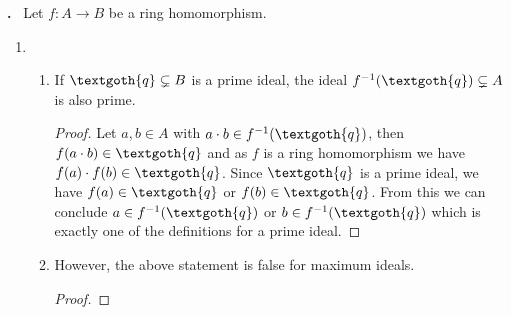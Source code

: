 \documentclass[11pt]{scrartcl}
\newcounter{problem}
\newcounter{solution}
\newcommand\Problem{%
  \stepcounter{problem}%
  \textbf{\theproblem.}~%
  \setcounter{solution}{0}%
}
\begin{document}
\newpage

\Problem Let \(f: A \rightarrow B\) be a ring homomorphism.
\begin{enumerate}
    \item
    \begin{enumerate}
        \item If \(\textgoth{q} \subsetneq B\) is a prime ideal, the ideal \(f^{-1}(\textgoth{q}) \subsetneq A\) is also prime.
        \begin{proof}
            Let \(a, b \in A\) with \(a \cdot b \in f^{-1}(\textgoth{q})\), then \(f(a \cdot b) \in \textgoth{q}\) and as \(f\) is a ring homomorphism we have \(f(a) \cdot f(b) \in \textgoth{q}\). Since \(\textgoth{q}\) is a prime ideal, we have \(f(a) \in \textgoth{q}\) or \(f(b) \in \textgoth{q}\). From this we can conclude \(a \in f^{-1}(\textgoth{q})\) or \(b \in f^{-1}(\textgoth{q})\) which is exactly one of the definitions for a prime ideal.
        \end{proof}
        \item However, the above statement is false for maximum ideals.
        \begin{proof}
        \end{proof}
    \end{enumerate}
\end{enumerate}
\end{document}
